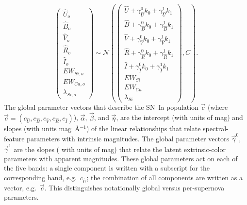 \documentclass{aastex61}   	%
\begin{document}
\begin{equation}
\begin{pmatrix}
{\hat{U}}_o\\{\hat{B}}_o\\ {\hat{V}}_o\\{\hat{R}}_o\\{\hat{I}}_o\\EW_{Si, o}\\ EW_{Ca, o} \\ \lambda_{Si, o}
\end{pmatrix}
\sim \mathcal{N}
\left(
\begin{pmatrix}
{\hat{U}} +\gamma^0_{{\hat{U}}} k_0 +\gamma^1_{{\hat{U}}} k_1 \\{\hat{B}} +\gamma^0_{{\hat{B}}} k_0 +\gamma^1_{{\hat{B}}} k_1 \\
{\hat{V}}+\gamma^0_{{\hat{V}}} k_0+\gamma^1_{{\hat{V}}} k_1\\{\hat{R}}+\gamma^0_{{\hat{R}}} k_0 + \gamma^1_{{\hat{R}}} k_1\\{\hat{I}}+\gamma^0_{{\hat{I}}} k_0+\gamma^1_{{\hat{I}}} k_1\\
EW_{Si}\\ EW_{Ca} \\ \lambda_{Si}
\end{pmatrix}
,C
\right).
\label{dust:eqn}
\end{equation}
The global parameter vectors that describe the SN~Ia population
$\vec{c}$ (where $\vec{c}=(c_{\hat{U}}, c_{\hat{B}}, c_{\hat{V}}, c_{\hat{R}}, c_{\hat{I}}) $),
$\vec{\alpha}$, $\vec{\beta}$,  and $\vec{\eta}$,  are the intercept
\color{red}(with units of mag) and slopes (with units mag~\AA$^{-1}$)
\color{black} of the linear relationships that
relate spectral-feature parameters with intrinsic magnitudes.
The global parameter vectors $\vec{\gamma}^0$, $\vec{\gamma}^1$  are the slopes (\color{red}
with units of mag) \color{black} that relate 
the latent extrinsic-color parameters with apparent magnitudes.
\color{red}
These global parameters act on each of the five bands: a single component is written with a subscript for the corresponding band, e.g.\  $c_{\hat{U}}$; 
the combination of all components are written as a vector, e.g.\ $\vec{c}$.  This distinguishes
notationally global versus per-supernova parameters.
\color{black}
\end{document}
